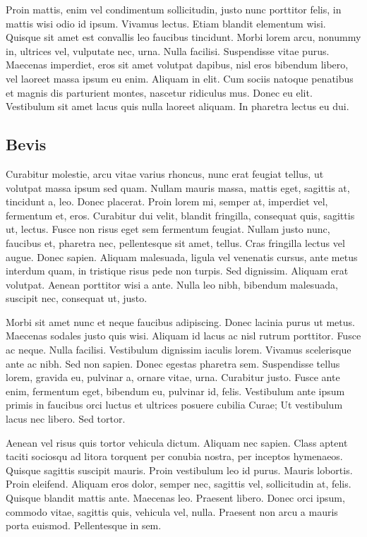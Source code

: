 \documentclass[a4paper,11pt]{kth-mag}
\begin{document}
Proin mattis, enim vel condimentum sollicitudin, justo nunc porttitor
felis, in mattis wisi odio id ipsum. Vivamus lectus. Etiam blandit
elementum wisi. Quisque sit amet est convallis leo faucibus tincidunt.
Morbi lorem arcu, nonummy in, ultrices vel, vulputate nec, urna. Nulla
facilisi. Suspendisse vitae purus. Maecenas imperdiet, eros sit amet
volutpat dapibus, nisl eros bibendum libero, vel laoreet massa ipsum
eu enim. Aliquam in elit. Cum sociis natoque penatibus et magnis dis
parturient montes, nascetur ridiculus mus. Donec eu elit. Vestibulum
sit amet lacus quis nulla laoreet aliquam. In pharetra lectus eu dui.

\subsection{Bevis}

Curabitur molestie, arcu vitae varius rhoncus, nunc erat feugiat
tellus, ut volutpat massa ipsum sed quam. Nullam mauris massa, mattis
eget, sagittis at, tincidunt a, leo. Donec placerat. Proin lorem mi,
semper at, imperdiet vel, fermentum et, eros. Curabitur dui velit,
blandit fringilla, consequat quis, sagittis ut, lectus. Fusce non
risus eget sem fermentum feugiat. Nullam justo nunc, faucibus et,
pharetra nec, pellentesque sit amet, tellus. Cras fringilla lectus vel
augue. Donec sapien. Aliquam malesuada, ligula vel venenatis cursus,
ante metus interdum quam, in tristique risus pede non turpis. Sed
dignissim. Aliquam erat volutpat. Aenean porttitor wisi a ante. Nulla
leo nibh, bibendum malesuada, suscipit nec, consequat ut, justo.

Morbi sit amet nunc et neque faucibus adipiscing. Donec lacinia purus
ut metus. Maecenas sodales justo quis wisi. Aliquam id lacus ac nisl
rutrum porttitor. Fusce ac neque. Nulla facilisi. Vestibulum dignissim
iaculis lorem. Vivamus scelerisque ante ac nibh. Sed non sapien. Donec
egestas pharetra sem. Suspendisse tellus lorem, gravida eu, pulvinar
a, ornare vitae, urna. Curabitur justo. Fusce ante enim, fermentum
eget, bibendum eu, pulvinar id, felis. Vestibulum ante ipsum primis in
faucibus orci luctus et ultrices posuere cubilia Curae; Ut vestibulum
lacus nec libero. Sed tortor.

Aenean vel risus quis tortor vehicula dictum. Aliquam nec sapien.
Class aptent taciti sociosqu ad litora torquent per conubia nostra,
per inceptos hymenaeos. Quisque sagittis suscipit mauris. Proin
vestibulum leo id purus. Mauris lobortis. Proin eleifend. Aliquam eros
dolor, semper nec, sagittis vel, sollicitudin at, felis. Quisque
blandit mattis ante. Maecenas leo. Praesent libero. Donec orci ipsum,
commodo vitae, sagittis quis, vehicula vel, nulla. Praesent non arcu a
mauris porta euismod. Pellentesque in sem.
\end{document}
